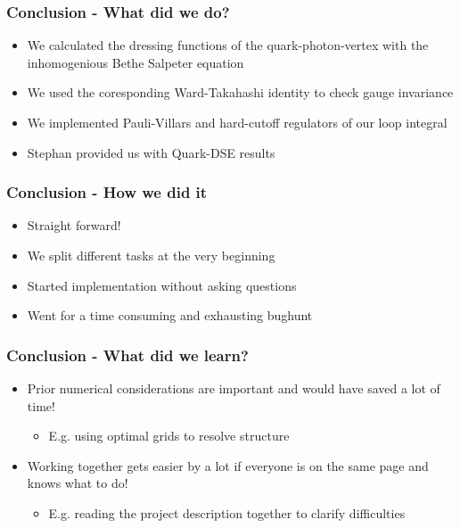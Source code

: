 \begin{frame}
	\frametitle{Conclusion - What did we do?}
			\begin{itemize}
				\item We calculated the dressing functions of the quark-photon-vertex with the inhomogenious Bethe Salpeter equation
					\vspace{2mm}
				\item We used the coresponding Ward-Takahashi identity to check gauge invariance
					\vspace{2mm}
				\item We implemented Pauli-Villars and hard-cutoff regulators of our loop integral 
					\vspace{2mm}
				\item Stephan provided us with Quark-DSE results
			\end{itemize}
\end{frame}

\begin{frame}
	\frametitle{Conclusion - How we did it} 
			\begin{itemize}
				\item Straight forward!
					\vspace{2mm}
				\item We split different tasks at the very beginning
					\vspace{2mm}
				\item Started implementation without asking questions
					\vspace{2mm}
				\item Went for a time consuming and exhausting bughunt
			\end{itemize}
\end{frame}


\begin{frame}
    \frametitle{Conclusion - What did we learn?}
    \begin{itemize}
        \item Prior numerical considerations are important and would have saved a lot of time!
        	\begin{itemize}
        		\item E.g. using optimal grids to resolve structure
        	\end{itemize}
        		\vspace{3mm}
        \item Working together gets easier by a lot if everyone is on the same page and knows what to do!
        	\begin{itemize}
                \item E.g. reading the project description together to clarify difficulties
        	\end{itemize}
    \end{itemize}
\end{frame}
